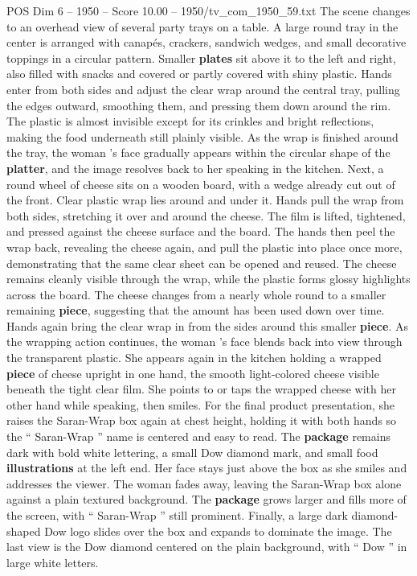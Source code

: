 \begin{textsample}{POS Dim 6 – 1950 – Score 10.00 – 1950/tv\_com\_1950\_59.txt}
The scene changes to an overhead view of several party trays on a table.
A large round tray in the center is arranged with canapés, crackers, sandwich wedges, and small decorative toppings in a circular pattern.
Smaller \textbf{plates} sit above it to the left and right, also filled with snacks and covered or partly covered with shiny plastic.
Hands enter from both sides and adjust the clear wrap around the central tray, pulling the edges outward, smoothing them, and pressing them down around the rim.
The plastic is almost invisible except for its crinkles and bright reflections, making the food underneath still plainly visible.
As the wrap is finished around the tray, the woman ’s face gradually appears within the circular shape of the \textbf{platter}, and the image resolves back to her speaking in the kitchen.
Next, a round wheel of cheese sits on a wooden board, with a wedge already cut out of the front.
Clear plastic wrap lies around and under it.
Hands pull the wrap from both sides, stretching it over and around the cheese.
The film is lifted, tightened, and pressed against the cheese surface and the board.
The hands then peel the wrap back, revealing the cheese again, and pull the plastic into place once more, demonstrating that the same clear sheet can be opened and reused.
The cheese remains cleanly visible through the wrap, while the plastic forms glossy highlights across the board.
The cheese changes from a nearly whole round to a smaller remaining \textbf{piece}, suggesting that the amount has been used down over time.
Hands again bring the clear wrap in from the sides around this smaller \textbf{piece}.
As the wrapping action continues, the woman ’s face blends back into view through the transparent plastic.
She appears again in the kitchen holding a wrapped \textbf{piece} of cheese upright in one hand, the smooth light-colored cheese visible beneath the tight clear film.
She points to or taps the wrapped cheese with her other hand while speaking, then smiles.
For the final product presentation, she raises the Saran-Wrap box again at chest height, holding it with both hands so the “ Saran-Wrap ” name is centered and easy to read.
The \textbf{package} remains dark with bold white lettering, a small Dow diamond mark, and small food \textbf{illustrations} at the left end.
Her face stays just above the box as she smiles and addresses the viewer.
The woman fades away, leaving the Saran-Wrap box alone against a plain textured background.
The \textbf{package} grows larger and fills more of the screen, with “ Saran-Wrap ” still prominent.
Finally, a large dark diamond-shaped Dow logo slides over the box and expands to dominate the image.
The last view is the Dow diamond centered on the plain background, with “ Dow ” in large white letters.

\end{textsample}
